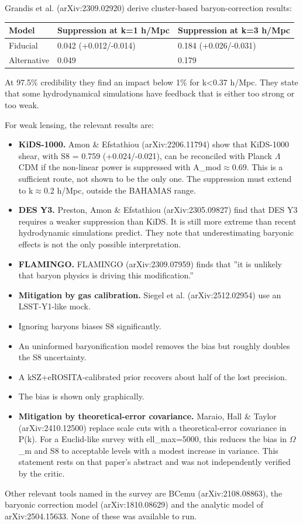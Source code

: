 \documentclass[11pt,a4paper]{article}
\begin{document}
Grandis et al. (arXiv:2309.02920) derive cluster-based baryon-correction results:

\begin{longtable}{@{}p{}p{}p{}@{}}
\toprule
\textbf{Model} & \textbf{Suppression at k=1 h/Mpc} & \textbf{Suppression at k=3 h/Mpc} \\ \midrule \endhead
Fiducial & 0.042 (+0.012/-0.014) & 0.184 (+0.026/-0.031) \\
Alternative & 0.049 & 0.179 \\
\bottomrule\end{longtable}
At 97.5\% credibility they find an impact below 1\% for k\textless{}0.37 h/Mpc. They state that some hydrodynamical simulations have feedback that is either too strong or too weak.

For weak lensing, the relevant results are:

\begin{itemize}
  \item \textbf{KiDS-1000.} Amon \& Efstathiou (arXiv:2206.11794) show that KiDS-1000 shear, with S8 = 0.759 (+0.024/-0.021), can be reconciled with Planck $\Lambda$CDM if the non-linear power is suppressed with A\_mod$\approx$0.69. This is a sufficient route, not shown to be the only one. The suppression must extend to k$\approx$0.2 h/Mpc, outside the BAHAMAS range.
  \item \textbf{DES Y3.} Preston, Amon \& Efstathiou (arXiv:2305.09827) find that DES Y3 requires a weaker suppression than KiDS. It is still more extreme than recent hydrodynamic simulations predict. They note that underestimating baryonic effects is not the only possible interpretation.
  \item \textbf{FLAMINGO.} FLAMINGO (arXiv:2309.07959) finds that ''it is unlikely that baryon physics is driving this modification.''
  \item \textbf{Mitigation by gas calibration.} Siegel et al. (arXiv:2512.02954) use an LSST-Y1-like mock.
  \item Ignoring baryons biases S8 significantly.
  \item An uninformed baryonification model removes the bias but roughly doubles the S8 uncertainty.
  \item A kSZ+eROSITA-calibrated prior recovers about half of the lost precision.
  \item The bias is shown only graphically.
  \item \textbf{Mitigation by theoretical-error covariance.} Maraio, Hall \& Taylor (arXiv:2410.12500) replace scale cuts with a theoretical-error covariance in P(k). For a Euclid-like survey with ell\_max=5000, this reduces the bias in $\Omega$\_m and S8 to acceptable levels with a modest increase in variance. This statement rests on that paper's abstract and was not independently verified by the critic.
\end{itemize}
Other relevant tools named in the survey are BCemu (arXiv:2108.08863), the baryonic correction model (arXiv:1810.08629) and the analytic model of arXiv:2504.15633. None of these was available to run.
\end{document}
